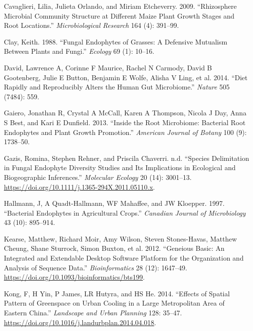 \documentclass[fleqn,10pt,lineno]{wlpeerj} %
\newlength{\cslhangindent}
\newenvironment{CSLReferences}[2] %
 {%
  \setlength{\parindent}{0pt}
  \ifodd #1 \everypar{\setlength{\hangindent}{\cslhangindent}}\ignorespaces\fi
  \ifnum #2 > 0
  \setlength{\parskip}{#2\baselineskip}
  \fi
 }%
 {}
\begin{document}
\begin{CSLReferences}{1}{0}
\leavevmode{}%
Cavaglieri, Lilia, Julieta Orlando, and Miriam Etcheverry. 2009.
{``Rhizosphere Microbial Community Structure at Different Maize Plant
Growth Stages and Root Locations.''} \emph{Microbiological Research} 164
(4): 391--99.

\leavevmode{}%
Clay, Keith. 1988. {``Fungal Endophytes of Grasses: A Defensive
Mutualism Between Plants and Fungi.''} \emph{Ecology} 69 (1): 10--16.

\leavevmode{}%
David, Lawrence A, Corinne F Maurice, Rachel N Carmody, David B
Gootenberg, Julie E Button, Benjamin E Wolfe, Alisha V Ling, et al.
2014. {``Diet Rapidly and Reproducibly Alters the Human Gut
Microbiome.''} \emph{Nature} 505 (7484): 559.

\leavevmode{}%
Gaiero, Jonathan R, Crystal A McCall, Karen A Thompson, Nicola J Day,
Anna S Best, and Kari E Dunfield. 2013. {``Inside the Root Microbiome:
Bacterial Root Endophytes and Plant Growth Promotion.''} \emph{American
Journal of Botany} 100 (9): 1738--50.

\leavevmode{}%
Gazis, Romina, Stephen Rehner, and Priscila Chaverri. n.d. {``Species
Delimitation in Fungal Endophyte Diversity Studies and Its Implications
in Ecological and Biogeographic Inferences.''} \emph{Molecular Ecology}
20 (14): 3001--13.
\url{https://doi.org/10.1111/j.1365-294X.2011.05110.x}.

\leavevmode{}%
Hallmann, J, A Quadt-Hallmann, WF Mahaffee, and JW Kloepper. 1997.
{``Bacterial Endophytes in Agricultural Crops.''} \emph{Canadian Journal
of Microbiology} 43 (10): 895--914.

\leavevmode{}%
Kearse, Matthew, Richard Moir, Amy Wilson, Steven Stones-Havas, Matthew
Cheung, Shane Sturrock, Simon Buxton, et al. 2012. {``Geneious Basic: An
Integrated and Extendable Desktop Software Platform for the Organization
and Analysis of Sequence Data.''} \emph{Bioinformatics} 28 (12):
1647--49. \url{https://doi.org/10.1093/bioinformatics/bts199}.

\leavevmode{}%
Kong, F, H Yin, P James, LR Hutyra, and HS He. 2014. {``Effects of
Spatial Pattern of Greenspace on Urban Cooling in a Large Metropolitan
Area of Eastern China.''} \emph{Landscape and Urban Planning} 128:
35--47. \url{https://doi.org/10.1016/j.landurbplan.2014.04.018}.


\end{CSLReferences}
\end{document}
